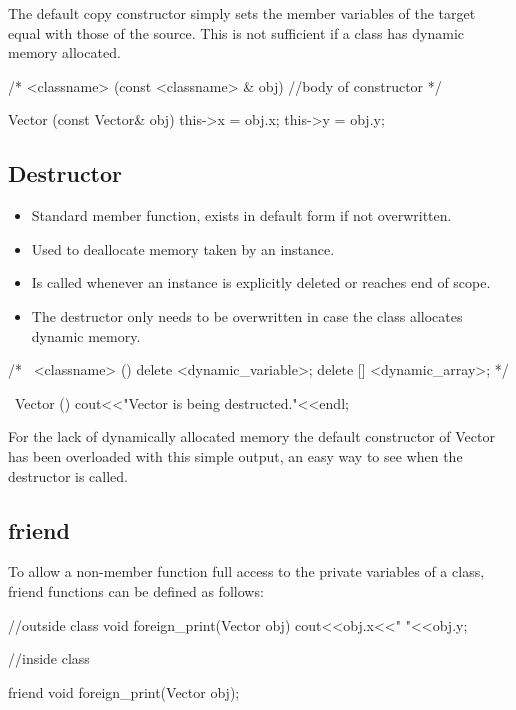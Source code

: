 \documentclass[10pt,a4paper]{scrartcl}
\begin{document}
\begin{multicols*}{2}
The default copy constructor simply sets the member variables of the target equal with those of the source. This is not sufficient if a class has dynamic memory allocated.

\begin{TPCpp}
/*
<classname> (const <classname> & obj) {
	//body of constructor
}
*/

Vector (const Vector& obj){
	this->x = obj.x;
	this->y = obj.y;
}
\end{TPCpp}

\subsection{Destructor}
\label{sec:Destructor}

\begin{itemize}
\item Standard member function, exists in default form if not overwritten.
\item Used to deallocate memory taken by an instance.
\item Is called whenever an instance is explicitly deleted or reaches end of scope.
\item The destructor only needs to be overwritten in case the class allocates dynamic memory.
\end{itemize}

\begin{TPCpp}
/*
~<classname> (){
	delete <dynamic_variable>;
	delete [] <dynamic_array>;
}
*/

~Vector (){
	cout<<"Vector is being destructed."<<endl;
}
\end{TPCpp}

For the lack of dynamically allocated memory the default constructor of Vector has been overloaded with this simple output, an easy way to see when the destructor is called.

\subsection{friend}
\label{sec:friend}

To allow a non-member function full access to the private variables of a class, friend functions can be defined as follows:

\begin{TPCpp}
//outside class
void foreign_print(Vector obj){
	cout<<obj.x<<" "<<obj.y;
}

//inside class

friend void foreign_print(Vector obj);
\end{TPCpp}


\end{multicols*}
\end{document}
